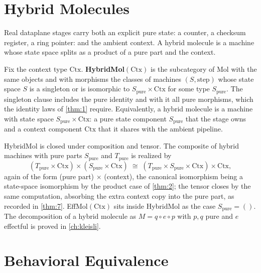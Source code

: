 \section{Hybrid Molecules}\label{sec:mol-hybrid}

Real dataplane stages carry both an explicit pure state: a counter, a
checksum register, a ring pointer: and the ambient context. A hybrid
molecule is a machine whose state space splits as a product of a pure part
and the context.

\begin{definition}[HybridMol]\label{def:hybridmol}
Fix the context type $\mathrm{Ctx}$. \textbf{HybridMol}$(\mathrm{Ctx})$ is
the subcategory of Mol with the same objects and with morphisms the classes
of machines $(S, \mathrm{step})$ whose state space $S$ is a singleton or is
isomorphic to $S_{\mathrm{pure}} \times \mathrm{Ctx}$ for some type
$S_{\mathrm{pure}}$. The singleton clause includes the pure identity and with
it all pure morphisms, which the identity laws of \autoref{thm:1} require.
Equivalently, a hybrid molecule is a machine with state space
$S_{\mathrm{pure}} \times \mathrm{Ctx}$: a pure state component
$S_{\mathrm{pure}}$ that the stage owns and a context component
$\mathrm{Ctx}$ that it shares with the ambient pipeline.
\end{definition}

\begin{remark}
HybridMol is closed under composition and tensor. The composite of hybrid
machines with pure parts $S_{\mathrm{pure}}$ and $T_{\mathrm{pure}}$ is
realized by
\[ (T_{\mathrm{pure}} \times \mathrm{Ctx}) \times (S_{\mathrm{pure}} \times \mathrm{Ctx})
   \;\cong\; (T_{\mathrm{pure}} \times S_{\mathrm{pure}} \times \mathrm{Ctx})
   \times \mathrm{Ctx} , \]
again of the form (pure part) $\times$ (context), the canonical isomorphism
being a state-space isomorphism by the product case of \autoref{thm:2}; the
tensor closes by the same computation, absorbing the extra context copy into
the pure part, as recorded in \autoref{thm:7}. EffMol$(\mathrm{Ctx})$ sits
inside HybridMol as the case $S_{\mathrm{pure}} = ()$. The decomposition of a
hybrid molecule as $M = q \circ e \circ p$ with $p, q$ pure and $e$
effectful is proved in \autoref{ch:kleisli}.
\end{remark}

\section{Behavioral Equivalence}\label{sec:mol-bisim}

